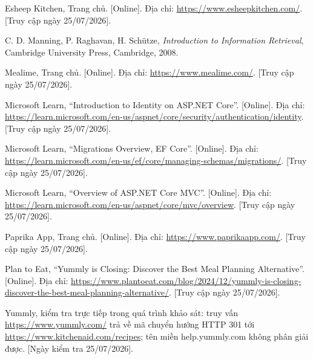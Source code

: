 \begin{list}{}{%
  \setlength{\labelwidth}{2.2em}
  \setlength{\leftmargin}{2.6em}
  \setlength{\labelsep}{0.4em}
  \setlength{\itemsep}{4pt}
  \setlength{\parsep}{0pt}
  \let\makelabel\tltklabel
}
\item[{[7]}] Esheep Kitchen, Trang chủ. [Online]. Địa chỉ:
\url{https://www.esheepkitchen.com/}. [Truy cập ngày 25/07/2026].

\item[{[8]}] C. D. Manning, P. Raghavan, H. Schütze, \textit{Introduction to
Information Retrieval}, Cambridge University Press, Cambridge, 2008.

\item[{[9]}] Mealime, Trang chủ. [Online]. Địa chỉ:
\url{https://www.mealime.com/}. [Truy cập ngày 25/07/2026].

\item[{[10]}] Microsoft Learn, ``Introduction to Identity on ASP.NET Core''.
[Online]. Địa chỉ:
\url{https://learn.microsoft.com/en-us/aspnet/core/security/authentication/identity}.
[Truy cập ngày 25/07/2026].

\item[{[11]}] Microsoft Learn, ``Migrations Overview, EF Core''. [Online]. Địa
chỉ: \url{https://learn.microsoft.com/en-us/ef/core/managing-schemas/migrations/}.
[Truy cập ngày 25/07/2026].

\item[{[12]}] Microsoft Learn, ``Overview of ASP.NET Core MVC''. [Online]. Địa
chỉ: \url{https://learn.microsoft.com/en-us/aspnet/core/mvc/overview}. [Truy cập
ngày 25/07/2026].

\item[{[13]}] Paprika App, Trang chủ. [Online]. Địa chỉ:
\url{https://www.paprikaapp.com/}. [Truy cập ngày 25/07/2026].

\item[{[14]}] Plan to Eat, ``Yummly is Closing: Discover the Best Meal Planning
Alternative''. [Online]. Địa chỉ:
\url{https://www.plantoeat.com/blog/2024/12/yummly-is-closing-discover-the-best-meal-planning-alternative/}.
[Truy cập ngày 25/07/2026].

\item[{[15]}] Yummly, kiểm tra trực tiếp trong quá trình khảo sát: truy vấn
\url{https://www.yummly.com/} trả về mã chuyển hướng HTTP 301 tới
\url{https://www.kitchenaid.com/recipes}; tên miền help.yummly.com không phân
giải được. [Ngày kiểm tra 25/07/2026].

\end{list}

